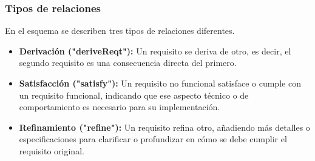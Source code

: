 \documentclass{article}
\begin{document}
\subsubsection{Tipos de relaciones}
En el esquema se describen tres tipos de relaciones diferentes.

\begin{itemize}
	\item \textbf{Derivación ("deriveReqt"):} Un requisito se deriva de otro, es decir, el segundo requisito es una consecuencia directa del primero.
	\item \textbf{Satisfacción ("satisfy"):} Un requisito no funcional satisface o cumple con un requisito funcional, indicando que ese aspecto técnico o de comportamiento es necesario para su implementación.
	\item \textbf{Refinamiento ("refine"):} Un requisito refina otro, añadiendo más detalles o especificaciones para clarificar o profundizar en cómo se debe cumplir el requisito original.
\end{itemize}
\end{document}
